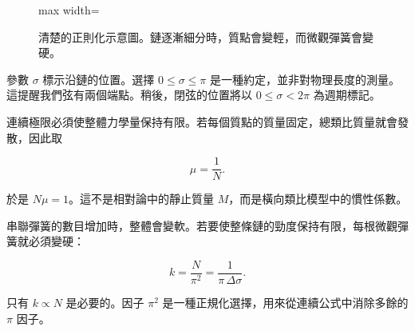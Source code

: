 \begin{figure}[H]
  \centering
  \begin{adjustbox}{max width=\linewidth}
  \end{adjustbox}
  \caption{清楚的正則化示意圖。鏈逐漸細分時，質點會變輕，而微觀彈簧會變硬。}
  \label{fig:l02-chain-redraw}
\end{figure}

參數 \(\sigma\) 標示沿鏈的位置。選擇 \(0\leq\sigma\leq\pi\) 是一種約定，並非對物理長度的測量。這提醒我們弦有兩個端點。稍後，閉弦的位置將以 \(0\leq\sigma<2\pi\) 為週期標記。

連續極限必須使整體力學量保持有限。若每個質點的質量固定，總類比質量就會發散，因此取

\begin{equation}
  \mu=\frac{1}{N}.
  \label{eq:l02-mu-scaling}
\end{equation}

於是 \(N\mu=1\)。這不是相對論中的靜止質量 \(M\)，而是橫向類比模型中的慣性係數。

串聯彈簧的數目增加時，整體會變軟。若要使整條鏈的勁度保持有限，每根微觀彈簧就必須變硬：

\begin{equation}
  k=\frac{N}{\pi^2}
  =\frac{1}{\pi\,\Delta\sigma}.
  \label{eq:l02-k-scaling}
\end{equation}

只有 \(k\propto N\) 是必要的。因子 \(\pi^2\) 是一種正規化選擇，用來從連續公式中消除多餘的 \(\pi\) 因子。

\begin{classroomqa}
\end{classroomqa}

